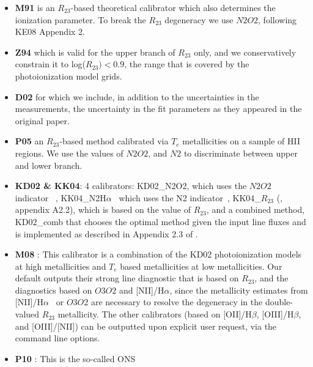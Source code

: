 \documentclass{emulateapj} \usepackage{amsmath} \usepackage{float}
\newcommand{\ha}{\ensuremath{\mathrm{H}\alpha}}
\newcommand{\hb}{\ensuremath{\mathrm{H}\beta}}
\begin{document}
\begin{itemize}
\item {\bf M91} \citep{mcgaugh91}
 is an $R_{23}$-based theoretical calibrator which
  also determines the ionization parameter. To break the $R_{23}$ degeneracy we use  $N2O2$, following KE08 Appendix 2. 
\item {\bf Z94} \citep{zaritsky94} which is valid for the upper branch
  of $R_{23}$ only, and we conservatively constrain it to
  log($R_{23})<0.9$, the range that is covered by the
  photoionization model grids.
\item {\bf D02} \citep{denicolo02} for which we include, in addition
  to the uncertainties in the measurements, the uncertainty in the fit
  parameters as they appeared in the original paper.
\item {\bf P05} \citep{pilyugin05} an $R_{23}$-based method calibrated via $T_e$ metallicities on a sample of HII regions. We use the values of $N2O2$, and $N2$ to discriminate between  upper and lower branch.
\item {\bf KD02 \& KK04}: 4 calibrators: KD02\_N2O2, which uses the
  $N2O2$ indicator~
\citep{kewley02}, KK04\_N2\ha~ which uses the N2
indicator~\citep{kobulnicky04}, KK04\_$R_{23}$ (\citealt{kewley08},
appendix A2.2), which is based on the value of $R_{23}$, and a
combined method, KD02\_comb that chooses the optimal method given the
input line fluxes and is implemented as described in Appendix 2.3 of
\citet{kewley08}.
\item {\bf M08} \citep{maiolino08}: This calibrator is a combination
  of the KD02 photoionization models at high metallicities and $T_e$
  based metallicities at low metallicities. Our default outputs their
  strong line diagnostic that is based on $R_{23}$, and the
  diagnostics based on $O3O2$ and [NII]/\ha, since the metallicity
  estimates from [NII]/\ha~ or $O3O2$ are necessary to resolve the
  degeneracy in the double-valued $R_{23}$ metallicity. The other
  calibrators (based on [OII]/\hb, [OIII]/\hb, and [OIII]/[NII]) can
  be outputted upon explicit user request, via the command line
  options.
\item {\bf P10} \citep{pilyugin10}: This is the so-called ONS

\end{itemize}
\end{document}
